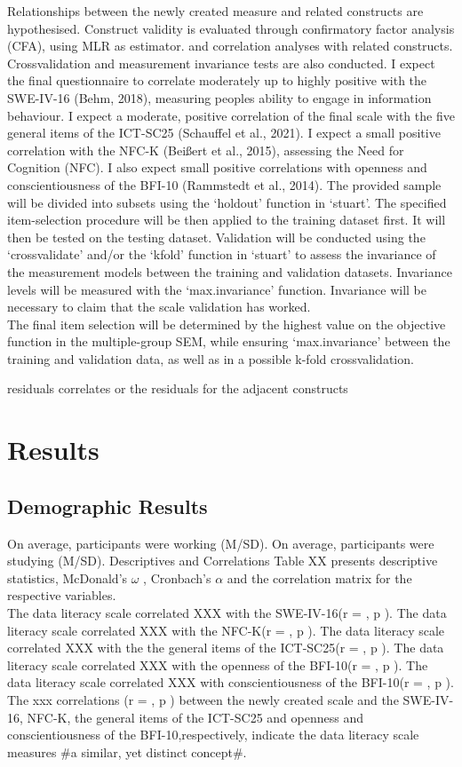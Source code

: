 \documentclass[
  12pt,
  a4paper,
  twoside]{article}
\begin{document}
Relationships between the newly created measure and related constructs are hypothesised. Construct validity is evaluated through confirmatory factor analysis (CFA), using MLR as estimator. and correlation analyses with related constructs. Crossvalidation and measurement invariance tests are also conducted.
I expect the final questionnaire to correlate moderately up to highly positive with the SWE-IV-16 (Behm, 2018), measuring peoples ability to engage in information behaviour. I expect a moderate, positive correlation of the final scale with the five general items of the ICT-SC25 (Schauffel et al., 2021). I expect a small positive correlation with the NFC-K (Beißert et al., 2015), assessing the Need for Cognition (NFC). I also expect small positive correlations with openness and conscientiousness of the BFI-10 (Rammstedt et al., 2014).
The provided sample will be divided into subsets using the `holdout' function in `stuart'. The specified item-selection procedure will be then applied to the training dataset first. It will then be tested on the testing dataset.
Validation will be conducted using the `crossvalidate' and/or the `kfold' function in `stuart' to assess the invariance of the measurement models between the training and validation datasets. Invariance levels will be measured with the `max.invariance' function. Invariance will be necessary to claim that the scale validation has worked.\\
The final item selection will be determined by the highest value on the objective function in the multiple-group SEM, while ensuring `max.invariance' between the training and validation data, as well as in a possible k-fold crossvalidation.

residuals
correlates or the residuals for the adjacent constructs

\section{Results}\label{results}

\subsection{Demographic Results}\label{demographic-results}

On average, participants were working (M/SD). On average, participants were studying (M/SD). Descriptives and Correlations
Table XX
presents descriptive statistics, McDonald's \(\omega\) ,
Cronbach's \(\alpha\) and the correlation matrix for the respective variables.\\
The data literacy scale correlated XXX with the SWE-IV-16(r = , p ). The data literacy scale correlated XXX with the NFC-K(r = , p ). The data literacy scale correlated XXX with the the general items of the ICT-SC25(r = , p ). The data literacy scale correlated XXX with the openness of the BFI-10(r = , p ). The data literacy scale correlated XXX with conscientiousness of the BFI-10(r = , p ). The xxx correlations (r = , p ) between the newly created scale and the SWE-IV-16, NFC-K, the general items of the ICT-SC25 and openness and conscientiousness of the BFI-10,respectively, indicate the data literacy scale measures \#a similar, yet distinct concept\#.
\end{document}
